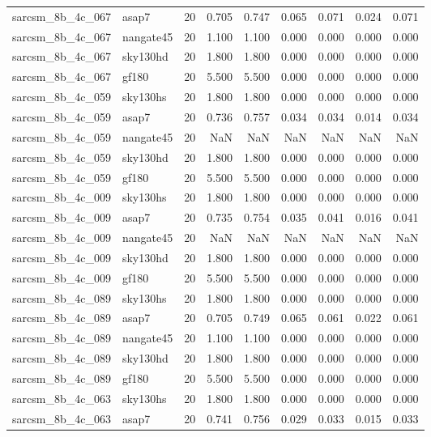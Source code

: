 \begin{tabular}{llrrrrrrr}
sarcsm\_8b\_4c\_067 & asap7 & 20 & 0.705 & 0.747 & 0.065 & 0.071 & 0.024 & 0.071 \\
sarcsm\_8b\_4c\_067 & nangate45 & 20 & 1.100 & 1.100 & 0.000 & 0.000 & 0.000 & 0.000 \\
sarcsm\_8b\_4c\_067 & sky130hd & 20 & 1.800 & 1.800 & 0.000 & 0.000 & 0.000 & 0.000 \\
sarcsm\_8b\_4c\_067 & gf180 & 20 & 5.500 & 5.500 & 0.000 & 0.000 & 0.000 & 0.000 \\
sarcsm\_8b\_4c\_059 & sky130hs & 20 & 1.800 & 1.800 & 0.000 & 0.000 & 0.000 & 0.000 \\
sarcsm\_8b\_4c\_059 & asap7 & 20 & 0.736 & 0.757 & 0.034 & 0.034 & 0.014 & 0.034 \\
sarcsm\_8b\_4c\_059 & nangate45 & 20 & NaN & NaN & NaN & NaN & NaN & NaN \\
sarcsm\_8b\_4c\_059 & sky130hd & 20 & 1.800 & 1.800 & 0.000 & 0.000 & 0.000 & 0.000 \\
sarcsm\_8b\_4c\_059 & gf180 & 20 & 5.500 & 5.500 & 0.000 & 0.000 & 0.000 & 0.000 \\
sarcsm\_8b\_4c\_009 & sky130hs & 20 & 1.800 & 1.800 & 0.000 & 0.000 & 0.000 & 0.000 \\
sarcsm\_8b\_4c\_009 & asap7 & 20 & 0.735 & 0.754 & 0.035 & 0.041 & 0.016 & 0.041 \\
sarcsm\_8b\_4c\_009 & nangate45 & 20 & NaN & NaN & NaN & NaN & NaN & NaN \\
sarcsm\_8b\_4c\_009 & sky130hd & 20 & 1.800 & 1.800 & 0.000 & 0.000 & 0.000 & 0.000 \\
sarcsm\_8b\_4c\_009 & gf180 & 20 & 5.500 & 5.500 & 0.000 & 0.000 & 0.000 & 0.000 \\
sarcsm\_8b\_4c\_089 & sky130hs & 20 & 1.800 & 1.800 & 0.000 & 0.000 & 0.000 & 0.000 \\
sarcsm\_8b\_4c\_089 & asap7 & 20 & 0.705 & 0.749 & 0.065 & 0.061 & 0.022 & 0.061 \\
sarcsm\_8b\_4c\_089 & nangate45 & 20 & 1.100 & 1.100 & 0.000 & 0.000 & 0.000 & 0.000 \\
sarcsm\_8b\_4c\_089 & sky130hd & 20 & 1.800 & 1.800 & 0.000 & 0.000 & 0.000 & 0.000 \\
sarcsm\_8b\_4c\_089 & gf180 & 20 & 5.500 & 5.500 & 0.000 & 0.000 & 0.000 & 0.000 \\
sarcsm\_8b\_4c\_063 & sky130hs & 20 & 1.800 & 1.800 & 0.000 & 0.000 & 0.000 & 0.000 \\
sarcsm\_8b\_4c\_063 & asap7 & 20 & 0.741 & 0.756 & 0.029 & 0.033 & 0.015 & 0.033 \\

\end{tabular}
